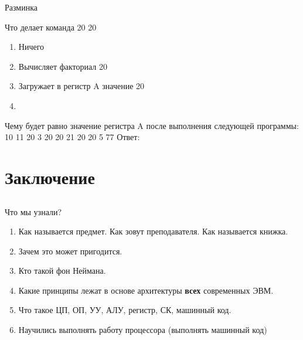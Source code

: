 \documentclass{beamer}
\begin{document}
    \begin{frame}{Разминка}
        \begin{block}{Что делает команда 20 20}
            \begin{enumerate}
                \item Ничего
                \item Вычисляет факториал 20
                \item Загружает в регистр A значение 20
                \item {}
                \end{enumerate}
        \end{block}
        \pause
        \begin{block}{Чему будет равно значение регистра A после выполнения следующей программы: \\
         10 11 20 3 20 20 21 20 20 5 77}
            Ответ: 
        \end{block}
    \end{frame}

    \section{Заключение}
    \subsection{}
    \begin{frame}
        \begin{block}{Что мы узнали?}
            \begin{enumerate}
                \item Как называется предмет. Как зовут преподавателя. Как называется книжка.
                \item Зачем это может пригодится.
                \item Кто такой фон Неймана.
                \item Какие принципы лежат в основе архитектуры {\bf всех} современных ЭВМ.
                \item Что такое ЦП, ОП, УУ, АЛУ, регистр, СК, машинный код.
                \item Научились выполнять работу процессора (выполнять машинный код)
            \end{enumerate}
        \end{block}
    \end{frame}
\end{document}

